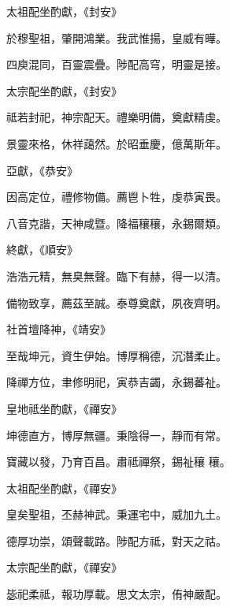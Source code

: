 \begin{pinyinscope}
 太祖配坐酌獻，《封安》



 於穆聖祖，肇開鴻業。我武惟揚，皇威有曄。



 四庾混同，百靈震疊。陟配高穹，明靈是接。



 太宗配坐酌獻，《封安》



 祗若封祀，神宗配天。禮樂明備，奠獻精虔。



 景靈來格，休祥藹然。於昭垂慶，億萬斯年。



 亞獻，《恭安》



 因高定位，禮修物備。薦鬯卜牲，虔恭寅畏。



 八音克諧，天神咸暨。降福穰穰，永錫爾類。



 終獻，《順安》



 浩浩元精，無臭無聲。臨下有赫，得一以清。



 備物致享，薦茲至誠。泰尊奠獻，夙夜齊明。



 社首壇降神，《靖安》



 至哉坤元，資生伊始。博厚稱德，沉潛柔止。



 降禪方位，聿修明祀，寅恭吉蠲，永錫蕃祉。



 皇地祗坐酌獻，《禪安》



 坤德直方，博厚無疆。秉陰得一，靜而有常。



 寶藏以發，乃育百昌。肅祗禪祭，錫祉穰
 穰。



 太祖配坐酌獻，《禪安》



 皇矣聖祖，丕赫神武。秉運宅中，威加九土。



 德厚功崇，頌聲載路。陟配方祗，對天之祜。



 太宗配坐酌獻，《禪安》



 毖祀柔祗，報功厚載。思文太宗，侑神嚴配。




\end{pinyinscope}
